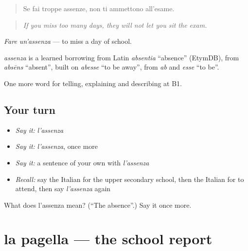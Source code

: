 \begin{quote}
Se fai troppe assenze, non ti ammettono all'esame.
\end{quote}

\begin{quote}
\emph{If you miss too many days, they will not let you sit the exam.}
\end{quote}

\emph{Fare un'assenza} — to miss a day of school.

\begin{cousinweb}
\emph{assenza} is a learned borrowing from Latin \emph{absentia} \textquotedblleft{}absence\textquotedblright{} (EtymDB), from \emph{absēns} \textquotedblleft{}absent\textquotedblright{}, built on \emph{abesse} \textquotedblleft{}to be away\textquotedblright{}, from \emph{ab} and \emph{esse} \textquotedblleft{}to be\textquotedblright{}.
\end{cousinweb}

\begin{grammarlens}[title={What you've built}]
One more word for telling, explaining and describing at B1.
\end{grammarlens}

\subsection*{Your turn}
\begin{itemize}
\raggedright
  \item \emph{Say it:} \emph{l'assenza}
  \item \emph{Say it:} \emph{l'assenza}, once more
  \item \emph{Say it:} a sentence of your own with \emph{l'assenza}
  \item \emph{Recall:} say the Italian for the upper secondary school, then the Italian for to attend, then say \emph{l'assenza} again
\end{itemize}

\begin{tcolorbox}[breakable,colback=teal!4,colframe=teal!35!black,title={Before you move on}]
What does l'assenza mean? (\textquotedblleft{}The absence\textquotedblright{}.) Say it once more.
\end{tcolorbox}
\section[la pagella]{la pagella — the school report}

\label{lesson:IT-C379-pagella}



